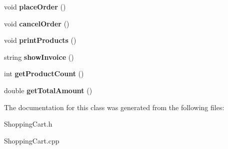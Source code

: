\begin{DoxyCompactItemize}
\mbox{\label{classShoppingCart_af02e91c37822093ea7d8a2d63e8601a4}} 
void {\bfseries place\+Order} ()
\item 
\mbox{\label{classShoppingCart_a5c0c28d996ac9eba943ec6086065d958}} 
void {\bfseries cancel\+Order} ()
\item 
\mbox{\label{classShoppingCart_a157942fdeff8e09c48bbd745ab3cf1e4}} 
void {\bfseries print\+Products} ()
\item 
\mbox{\label{classShoppingCart_a39a647d77d9dddbce4eb459f47d25dcc}} 
string {\bfseries show\+Invoice} ()
\item 
\mbox{\label{classShoppingCart_a13e1f55af8258d1beb8d343e1df7bf20}} 
int {\bfseries get\+Product\+Count} ()
\item 
\mbox{\label{classShoppingCart_ac09d762676e989a424e77f55299a0ee6}} 
double {\bfseries get\+Total\+Amount} ()
\end{DoxyCompactItemize}


The documentation for this class was generated from the following files\+:\begin{DoxyCompactItemize}
\item 
Shopping\+Cart.\+h\item 
Shopping\+Cart.\+cpp\end{DoxyCompactItemize}
